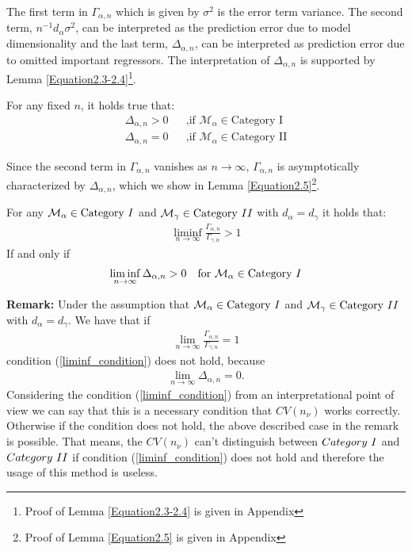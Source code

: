 \documentclass[Research_Module_ES.tex]{subfiles}
\begin{document}
 The first term in $\Gamma_{\alpha,n}$ which is given by $\sigma^2$ is the error term variance. The second term, $n^{-1}d_\alpha\sigma^2$, can be interpreted as the prediction error due to model dimensionality and the last term, $\Delta_{\alpha,n}$, can be interpreted as prediction error due to omitted important regressors. The interpretation of $\Delta_{\alpha,n}$ is supported by Lemma \ref{Equation2.3-2.4}\footnote{Proof of Lemma \ref{Equation2.3-2.4} is given in Appendix }.
\begin{lemma}
	\label{Equation2.3-2.4}
	For any fixed $n$, it holds true that:
	\begin{align*}
		&&\Delta_{\alpha,n}>0 &&\text{,if } \mathcal{M}_\alpha\in\text{Category I}&&\\
		&&\Delta_{\alpha,n}=0 &&\text{,if } \mathcal{M}_\alpha\in\text{Category II}&&
	\end{align*}
\end{lemma}
Since the second term in $\Gamma_{\alpha,n}$ vanishes as $n\to\infty$, $\Gamma_{\alpha,n}$ is asymptotically characterized by $\Delta_{\alpha,n}$, which we show in Lemma \ref{Equation2.5}\footnote{Proof of Lemma \ref{Equation2.5} is given in Appendix }. 
\begin{lemma}
	\label{Equation2.5}
	For any $\mathcal{M}_\alpha\in\text{Category}~\RM{1}$ and $\mathcal{M}_\gamma\in\text{Category}~\RM{2}$ with $d_\alpha=d_\gamma$ it holds that:
	\begin{align*}
	\liminf_{n\rightarrow\infty}\frac{\Gamma_{\alpha,n}}{\Gamma_{\gamma,n}}>1
	\end{align*}
	If and only if
	\begin{align}
	\liminf_{n\rightarrow\infty}\Delta_{\alpha,n}>0 \text{~~~for~}\mathcal{M}_\alpha\in\text{Category}~\RM{1} \label{liminf_condition}
	\end{align}
\end{lemma}

\textbf{Remark:}
	Under the assumption that $\mathcal{M}_\alpha\in\text{Category}~\RM{1}$ and $\mathcal{M}_\gamma\in\text{Category}~\RM{2}$ with $d_\alpha=d_\gamma$. We have that if
	\begin{align*}
		\lim_{n\rightarrow\infty}\frac{\Gamma_{\alpha,n}}{\Gamma_{\gamma,n}}=1
	\end{align*} 
	condition (\ref{liminf_condition}) does not hold, because
	\begin{align*}
	\lim_{n\rightarrow\infty}\Delta_{\alpha,n}=0.
	\end{align*}
Considering the condition (\ref{liminf_condition}) from an interpretational point of view we can say that
this is a necessary condition that $CV(n_\nu)$ works correctly. Otherwise if the condition does not hold, the above described case in the remark is possible. That means, the $CV(n_\nu)$ can't distinguish between $Category~\RM{1}$ and $Category~\RM{2}$ if condition (\ref{liminf_condition}) does not hold and therefore the usage of this method is useless.
\end{document}
